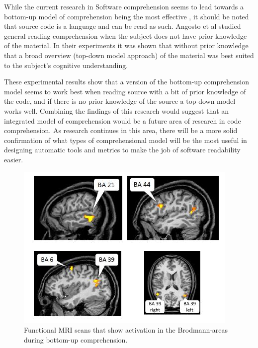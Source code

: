 While the current research in Software comprehension seems to lead towards a bottom-up model of
comprehension being the most effective \cite{siegmund_measuring_2017, siegmund_understanding_2014, yeh_detecting_2017, nakagawa_quantifying_2014}, it should be noted that source code is a language and can
be read as such. Angosto et al \cite{angosto_pdf_nodate} studied general reading comprehension when the
subject does not have prior knowledge of the material. In their experiments it was shown that without
prior knowledge that a broad overview (top-down model approach) of the material was best suited to the
subject's cognitive understanding. 

These experimental results show that a version of the bottom-up comprehension model seems to work best when reading source with a bit of prior knowledge of the code, and if there is no prior knowledge of the source a top-down model works well. Combining the findings of this research would suggest that an integrated model of comprehension would be a future area of research in code comprehension. As research continues in this area, there will be a more solid confirmation of what types of comprehensional model will be the most useful in designing automatic tools and metrics to make the job of software readability easier.

\begin{figure}[ht]
\centering
\includegraphics[scale=0.75]{images/fMRI}
\caption{Functional MRI scans that show activation in the Brodmann-areas during bottom-up comprehension.}
\label{fig:fMRI}
\end{figure}

